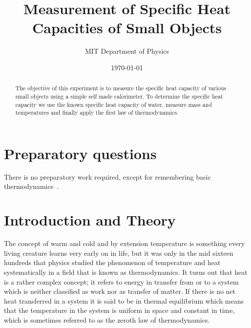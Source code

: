 \documentclass[10pt,aps,twocolumn,secnumarabic,balancelastpage,amsmath,amssymb,nofootinbib,floatfix]{revtex4}
\begin{document}
\title{Measurement of Specific Heat Capacities of Small Objects}
\author{MIT Department of Physics}
\date{\today}

\begin{abstract}
  The objective of this experiment is to measure the specific heat capacity of various small objects using a simple self made calorimeter.  To determine the specific heat capacity we use the known specific heat capacity of water, measure mass and temperatures and finally apply the first law of thermodynamics.
\end{abstract}

\maketitle

\section*{Preparatory questions}
There is no preparatory work required, except for remembering basic thermodynamics~\cite{Thermodynamics}.

\section{Introduction and Theory}

The concept of warm and cold and by extension temperature is something every living creature learns very early on in life, but it was only in the mid sixteen hundreds that physics studied the phenomenon of temperature and heat systematically in a field that is known as thermodynamics. It turns out that heat is a rather complex concept; it refers to energy in transfer from or to a system which is neither classified as work nor as transfer of matter. If there is no net heat transferred in a system it is said to be in thermal equilibrium which means that the temperature in the system is uniform in space and constant in time, which is sometimes referred to as the zeroth law of thermodynamics.
\end{document}

